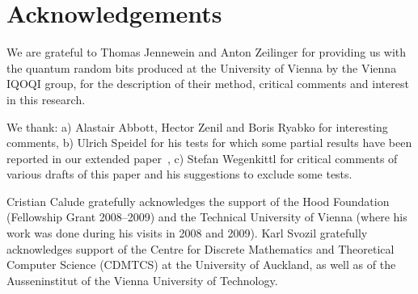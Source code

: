\documentclass[%
 preprint,
 showpacs,
 showkeys,
 preprintnumbers,
 amsmath,amssymb,
 aps,
 prl,
  longbibliography,
 ]{revtex4-1}
\begin{document}
\section*{Acknowledgements}
We are grateful to  Thomas Jennewein and Anton Zeilinger for providing us with the quantum random bits produced at the University of Vienna by the Vienna IQOQI group, for the description of their method, critical comments and  interest in this research.

We thank: a) Alastair Abbott, Hector Zenil and Boris Ryabko for interesting comments, b)
Ulrich Speidel for his tests for which some partial results have been reported in our extended paper~\cite{CDMTCS372},
c) Stefan Wegenkittl for critical comments of various drafts of this paper and his suggestions  to exclude  some tests.


Cristian Calude gratefully  acknowledges the support of  the Hood Foundation (Fellowship Grant 2008--2009) and the  Technical University of Vienna (where his work was done during his visits in 2008 and 2009).
Karl Svozil  gratefully  acknowledges support of the
Centre for Discrete Mathematics and Theoretical Computer Science (CDMTCS) at the University of Auckland, as well as of the Ausseninstitut of the Vienna University of Technology.




\end{document}
